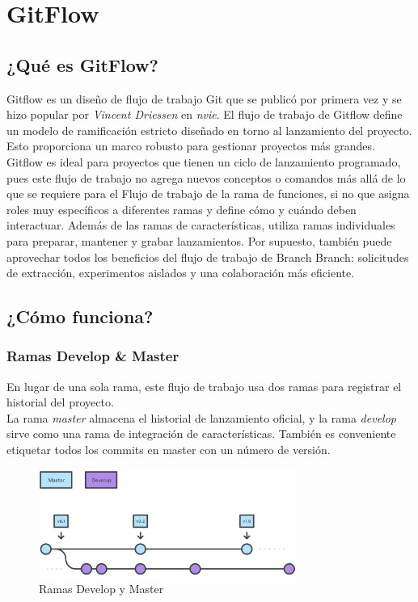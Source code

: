 \section{GitFlow}
\subsection{¿Qué es GitFlow?}

\quad Gitflow es un diseño de flujo de trabajo Git que se publicó por primera vez y se hizo popular por \textit{Vincent Driessen} en \textit{nvie}. El flujo de trabajo de Gitflow define un modelo de ramificación estricto diseñado en torno al lanzamiento del proyecto. Esto proporciona un marco robusto para gestionar proyectos más grandes.\\

\quad Gitflow es ideal para proyectos que tienen un ciclo de lanzamiento programado, pues este flujo de trabajo no agrega nuevos conceptos o comandos más allá de lo que se requiere para el Flujo de trabajo de la rama de funciones, si no que asigna roles muy específicos a diferentes ramas y define cómo y cuándo deben interactuar. Además de las ramas de características, utiliza ramas individuales para preparar, mantener y grabar lanzamientos. Por supuesto, también puede aprovechar todos los beneficios del flujo de trabajo de Branch Branch: solicitudes de extracción, experimentos aislados y una colaboración más eficiente.\\ 

\subsection{¿Cómo funciona? \cite{GitKraken2} \cite{GitFlow}}

\subsubsection{Ramas Develop \& Master}

\quad En lugar de una sola rama, este flujo de trabajo usa dos ramas para registrar el historial del proyecto.\\ 

\quad La rama \textit{master} almacena el historial de lanzamiento oficial, y la rama \textit{develop} sirve como una rama de integración de características. También es conveniente etiquetar todos los commits en master con un número de versión.\\

\begin{figure}[htb]
	\centering
	\includegraphics[width=0.75\textwidth]{./imagenes/master-dev}
	\caption{Ramas Develop y Master}
\end{figure}
\FloatBarrier

